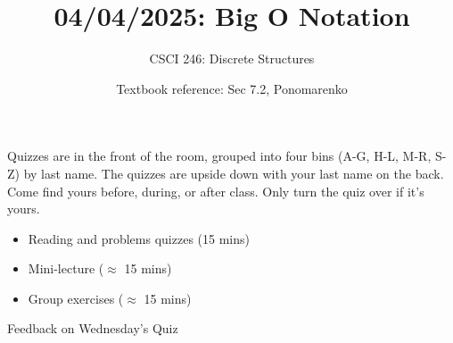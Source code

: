 \documentclass[10pt]{beamer}
\begin{document}




\title{04/04/2025: Big O Notation}
\author{CSCI 246: Discrete Structures}
\date{Textbook reference: Sec 7.2, Ponomarenko}

\begin{frame}
    \titlepage 
\end{frame}


\begin{frame}
\small
\begin{mygreenbox}[title=Graded Quiz Pickup]
Quizzes are in the front of the room, grouped into four bins (A-G, H-L, M-R, S-Z) by last name. The quizzes are upside down with your last name on the back. Come find yours before, during, or after class. Only turn the quiz over if it's yours.
\end{mygreenbox} 
\vfill 
%
\vfill 
\begin{myyellowbox}[title=Today's Agenda]
\begin{itemize}
	\item Reading and problems quizzes (15 mins)
	\item Mini-lecture ($\approx$ 15 mins)
	\item Group exercises ($\approx$ 15 mins)
\end{itemize}


\end{myyellowbox}
\vfill 

\end{frame}






\begin{frame}[standout]
Feedback on Wednesday's Quiz
\end{frame}
\end{document}
